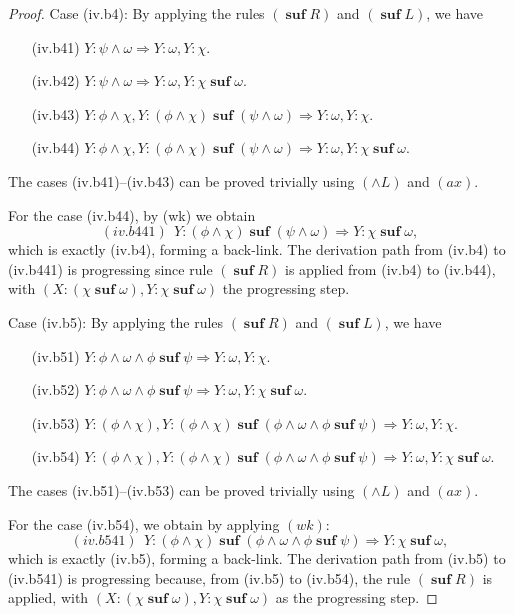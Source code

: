 \documentclass[manuscript,screen]{acmart}
\DeclareMathOperator{\osuf}{\mathbf{suf}}
\begin{document}
\begin{proof}
Case (iv.b4): By applying the rules  $(\osuf R)$ and $(\osuf L)$, we have
\begin{enumerate}
\item[(iv.b41)] $Y : \psi\wedge\omega\Rightarrow Y : \omega, Y : \chi$.
\item[(iv.b42)] $Y : \psi\wedge\omega\Rightarrow Y : \omega, Y : \chi\osuf\omega$.
\item[(iv.b43)] $Y : \phi\wedge \chi, Y : (\phi\wedge\chi)\osuf(\psi\wedge\omega)\Rightarrow Y : \omega, Y : \chi$.
\item[(iv.b44)] $Y : \phi\wedge \chi, Y : (\phi\wedge\chi)\osuf(\psi\wedge\omega)\Rightarrow Y : \omega, Y : \chi\osuf\omega$.
\end{enumerate}
The cases (iv.b41)--(iv.b43) can be proved trivially using $(\wedge L)$ and $(ax)$. 

For the case (iv.b44), by (wk) we obtain
$$
(iv.b441)\ \ Y : (\phi\wedge\chi)\osuf (\psi\wedge \omega) \Rightarrow Y : \chi\osuf \omega, 
$$
which is exactly (iv.b4), forming a back-link.
The derivation path from (iv.b4) to (iv.b441) is progressing since rule $(\osuf R)$ is applied from (iv.b4) to (iv.b44), with $(X : (\chi\osuf\omega), Y : \chi\osuf\omega)$ the progressing step.

Case (iv.b5): By applying the rules $(\osuf R)$ and $(\osuf L)$, we have
\begin{enumerate}
\item[(iv.b51)] $Y : \phi\wedge\omega\wedge \phi\osuf\psi\Rightarrow Y : \omega, Y : \chi$. 
\item[(iv.b52)] $Y : \phi\wedge\omega\wedge \phi\osuf\psi\Rightarrow Y : \omega, Y : \chi\osuf\omega$. 
\item[(iv.b53)] $Y : (\phi\wedge\chi), Y : (\phi\wedge\chi)\osuf(\phi\wedge \omega\wedge \phi\osuf \psi)\Rightarrow Y : \omega, Y : \chi$. 
\item[(iv.b54)] $Y : (\phi\wedge\chi), Y : (\phi\wedge\chi)\osuf(\phi\wedge \omega\wedge \phi\osuf \psi)\Rightarrow Y : \omega, Y : \chi\osuf\omega$. 
\end{enumerate}
The cases (iv.b51)--(iv.b53) can be proved trivially using $(\wedge L)$ and $(ax)$. 

For the case (iv.b54), we obtain by applying $(wk)$:
$$
(iv.b541)\ \ Y : (\phi\wedge\chi)\osuf (\phi\wedge \omega\wedge \phi\osuf \psi) \Rightarrow Y : \chi\osuf \omega, 
$$
which is exactly (iv.b5), forming a back-link.
The derivation path from (iv.b5) to (iv.b541) is progressing because, from (iv.b5) to (iv.b54), the rule $(\osuf R)$ is applied, with $(X : (\chi\osuf\omega), Y : \chi\osuf\omega)$ as the progressing step. 


\end{proof}
\end{document}

